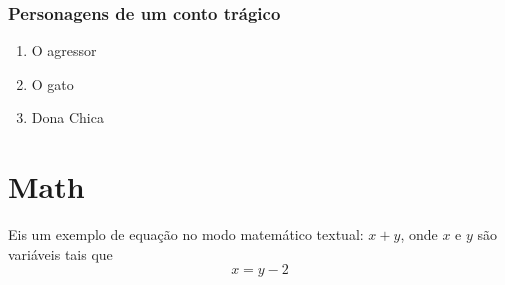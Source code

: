 \documentclass[11pt]{article}
\begin{document}
\subsubsection{Personagens de um conto trágico}
\begin{enumerate}
    \item O agressor
    \item O gato
    \item Dona Chica
\end{enumerate}


\section{Math}
Eis um exemplo de equação no modo matemático textual: $x+y$, onde $x$ e $y$
são variáveis tais que 
\begin{equation}
%
    x = y - 2
%
\end{equation}
\end{document}

